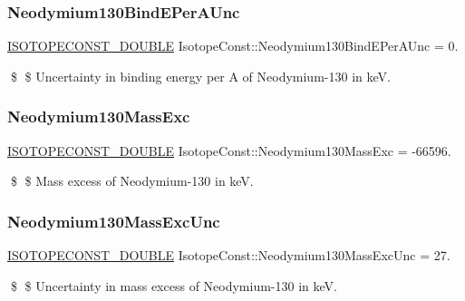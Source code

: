 \subsubsection{\texorpdfstring{Neodymium130\+Bind\+E\+Per\+A\+Unc}{Neodymium130BindEPerAUnc}}
{\footnotesize\ttfamily \mbox{\hyperlink{group___isotope_const-_macros_ga8f45a7272ce02c0b4c65c44636ed719a}{I\+S\+O\+T\+O\+P\+E\+C\+O\+N\+S\+T\+\_\+\+D\+O\+U\+B\+LE}} Isotope\+Const\+::\+Neodymium130\+Bind\+E\+Per\+A\+Unc = 0.}

\$ \$ Uncertainty in binding energy per A of Neodymium-\/130 in keV. \mbox{\label{group___isotope_const-_neodymium-_nd130_ga42d29f62d4b121d96f0f4c584520956d}} 
\subsubsection{\texorpdfstring{Neodymium130\+Mass\+Exc}{Neodymium130MassExc}}
{\footnotesize\ttfamily \mbox{\hyperlink{group___isotope_const-_macros_ga8f45a7272ce02c0b4c65c44636ed719a}{I\+S\+O\+T\+O\+P\+E\+C\+O\+N\+S\+T\+\_\+\+D\+O\+U\+B\+LE}} Isotope\+Const\+::\+Neodymium130\+Mass\+Exc = -\/66596.}

\$ \$ Mass excess of Neodymium-\/130 in keV. \mbox{\label{group___isotope_const-_neodymium-_nd130_gaf53b8215875e97f53373fc75bc89ac3c}} 
\subsubsection{\texorpdfstring{Neodymium130\+Mass\+Exc\+Unc}{Neodymium130MassExcUnc}}
{\footnotesize\ttfamily \mbox{\hyperlink{group___isotope_const-_macros_ga8f45a7272ce02c0b4c65c44636ed719a}{I\+S\+O\+T\+O\+P\+E\+C\+O\+N\+S\+T\+\_\+\+D\+O\+U\+B\+LE}} Isotope\+Const\+::\+Neodymium130\+Mass\+Exc\+Unc = 27.}

\$ \$ Uncertainty in mass excess of Neodymium-\/130 in keV. \mbox{\label{group___isotope_const-_neodymium-_nd130_ga0e6e7976c411976a8821183b4f2d5912}} 
